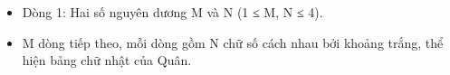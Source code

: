\begin{itemize}
	\item Dòng 1: Hai số nguyên dương M và N (1 ≤ M, N ≤ 4).
	\item M dòng tiếp theo, mỗi dòng gồm N chữ số cách nhau bởi khoảng trắng, thể hiện bảng chữ nhật của Quân.
\end{itemize}